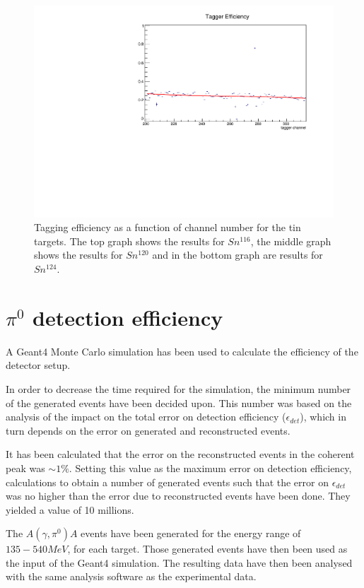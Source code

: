 \begin{figure}[H]
\begin{center}
\includegraphics[scale=0.55]{pictures/pdf/tagging_efficiency_Sn124.pdf}
\caption{Tagging efficiency as a function of channel number for the tin targets. The top graph shows the results for $Sn^{116}$, the middle graph shows the results for $Sn^{120}$ and in the bottom graph are results for $Sn^{124}$.}
\label{taggingeff}
\end{center}
\end{figure}


\section{$\pi^{0}$ detection efficiency}

\indent A Geant4 Monte Carlo simulation has been used to calculate the efficiency of the detector setup.

\indent In order to decrease the time required for the simulation, the minimum number of the generated events have been decided upon. This number was based on the analysis of the impact on the total error on detection efficiency ($\epsilon_{det}$), which in turn depends on the error on generated and reconstructed events.

\indent It has been calculated that the error on the reconstructed events in the coherent peak was $\sim1\%$. Setting this value as the maximum error on detection efficiency, calculations to obtain a number of generated events such that the error on $\epsilon_{det}$ was no higher than the error due to reconstructed events have been done. They yielded a value of 10 millions.

\indent The $A(\gamma,\pi^{0})A$ events have been generated for the energy range of $135-540MeV$, for each target. Those generated events have then been used as the input of the Geant4 simulation. The resulting data have then been analysed with the same analysis software as the experimental data.

